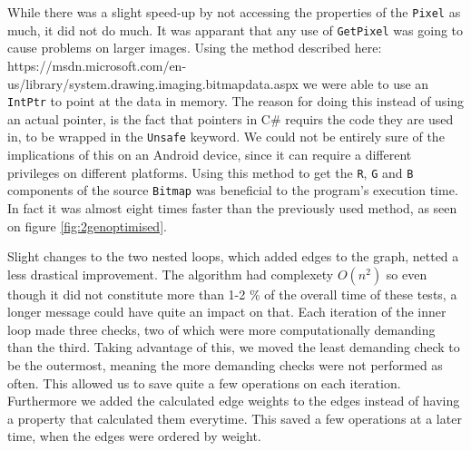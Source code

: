 While there was a slight speed-up by not accessing the properties of the \lstinline|Pixel| as much, it did not do much.
It was apparant that any use of \lstinline|GetPixel| was going to cause problems on larger images.
Using the method described here: https://msdn.microsoft.com/en-us/library/system.drawing.imaging.bitmapdata.aspx we were able to use an \lstinline|IntPtr| to point at the data in memory.
The reason for doing this instead of using an actual pointer, is the fact that pointers in C\# requirs the code they are used in, to be wrapped in the \lstinline|Unsafe| keyword. 
We could not be entirely sure of the implications of this on an Android device, since it can require a different privileges on different platforms.
Using this method to get the \lstinline|R|, \lstinline|G| and \lstinline|B| components of the source \lstinline|Bitmap| was beneficial to the program's execution time.
In fact it was almost eight times faster than the previously used method, as seen on figure \ref{fig:2genoptimised}.

Slight changes to the two nested loops, which added edges to the graph, netted a less drastical improvement.
The algorithm had complexety $O(n^2)$ so even though it did not constitute more than 1-2 \% of the overall time of these tests, a longer message could have quite an impact on that.
Each iteration of the inner loop made three checks, two of which were more computationally demanding than the third.
Taking advantage of this, we moved the least demanding check to be the outermost, meaning the more demanding checks were not performed as often.
This allowed us to save quite a few operations on each iteration. 
Furthermore we added the calculated edge weights to the edges instead of having a property that calculated them everytime. 
This saved a few operations at a later time, when the edges were ordered by weight.

